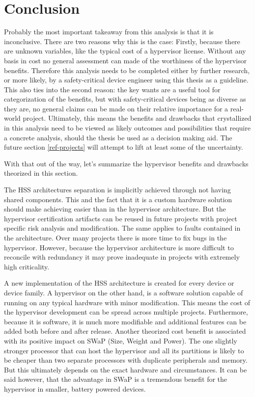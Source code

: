 
\section{Conclusion}
Probably the most important takeaway from this analysis is that it is inconclusive. There are two reasons why this is the case: Firstly, because there are unknown variables, like the typical cost of a hypervisor license. Without any basis in cost no general assessment can made of the worthiness of the hypervisor benefits. Therefore this analysis needs to be completed either by further research, or more likely, by a safety-critical device engineer using this thesis as a guideline. This also ties into the second reason: the key wants are a useful tool for categorization of the benefits, but with safety-critical devices being as diverse as they are, no general claims can be made on their relative importance for a real-world project. Ultimately, this means the benefits and drawbacks that crystallized in this analysis need to be viewed as likely outcomes and possibilities that require a concrete analysis, should the thesis be used as a decision making aid. The future section \ref{ref-projects} will attempt to lift at least some of the uncertainty.

With that out of the way, let's summarize the hypervisor benefits 
and drawbacks theorized in this section.

The \gls{HSS} architectures separation is implicitly achieved through not having shared components. This and the fact that it is a custom hardware solution should make achieving  easier than in the hypervisor architecture. But the hypervisor certification artifacts can be reused in future projects with project specific risk analysis and modification. The same applies to faults contained in the architecture. Over many projects there is more time to fix bugs in the hypervisor. However, because the hypervisor architecture is more difficult to reconcile with redundancy it may prove inadequate in projects with extremely high criticality.

A new implementation of the \gls{HSS} architecture is created for every device or device family. A hypervisor on the other hand, is a software solution capable of running on any typical hardware with minor modification. This means the cost of the hypervisor development can be spread across multiple projects. Furthermore, because it is software, it is much more modifiable and additional features can be added both before and after release. Another theorized cost benefit is associated with its positive impact on \gls{SWaP} (Size, Weight and Power). The one slightly stronger processor that can host the hypervisor and all its partitions is likely to be cheaper than two separate processors with duplicate peripherals and memory. But this ultimately depends on the exact hardware and circumstances. It can be said however, that the advantage in \gls{SWaP} is a tremendous benefit for the hypervisor in smaller, battery powered devices.

